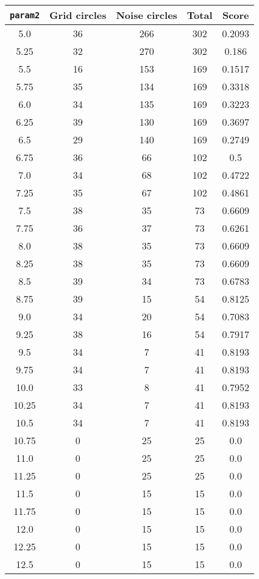 \documentclass[letterpaper, 12pt]{article}
\begin{document}
\begin{longtable}{|c|c|c|c|c|}
\hline
\textbf{\texttt{param2}} & \textbf{Grid circles} & \textbf{Noise circles} & \textbf{Total} & \textbf{Score} \\
\hline
5.0 & 36 & 266 & 302 & 0.2093 \\
\hline
5.25 & 32 & 270 & 302 & 0.186 \\
\hline
5.5 & 16 & 153 & 169 & 0.1517 \\
\hline
5.75 & 35 & 134 & 169 & 0.3318 \\
\hline
6.0 & 34 & 135 & 169 & 0.3223 \\
\hline
6.25 & 39 & 130 & 169 & 0.3697 \\
\hline
6.5 & 29 & 140 & 169 & 0.2749 \\
\hline
6.75 & 36 & 66 & 102 & 0.5 \\
\hline
7.0 & 34 & 68 & 102 & 0.4722 \\
\hline
7.25 & 35 & 67 & 102 & 0.4861 \\
\hline
7.5 & 38 & 35 & 73 & 0.6609 \\
\hline
7.75 & 36 & 37 & 73 & 0.6261 \\
\hline
8.0 & 38 & 35 & 73 & 0.6609 \\
\hline
8.25 & 38 & 35 & 73 & 0.6609 \\
\hline
8.5 & 39 & 34 & 73 & 0.6783 \\
\hline
8.75 & 39 & 15 & 54 & 0.8125 \\
\hline
9.0 & 34 & 20 & 54 & 0.7083 \\
\hline
9.25 & 38 & 16 & 54 & 0.7917 \\
\hline
9.5 & 34 & 7 & 41 & 0.8193 \\
\hline
9.75 & 34 & 7 & 41 & 0.8193 \\
\hline
10.0 & 33 & 8 & 41 & 0.7952 \\
\hline
10.25 & 34 & 7 & 41 & 0.8193 \\
\hline
10.5 & 34 & 7 & 41 & 0.8193 \\
\hline
10.75 & 0 & 25 & 25 & 0.0 \\
\hline
11.0 & 0 & 25 & 25 & 0.0 \\
\hline
11.25 & 0 & 25 & 25 & 0.0 \\
\hline
11.5 & 0 & 15 & 15 & 0.0 \\
\hline
11.75 & 0 & 15 & 15 & 0.0 \\
\hline
12.0 & 0 & 15 & 15 & 0.0 \\
\hline
12.25 & 0 & 15 & 15 & 0.0 \\
\hline
12.5 & 0 & 15 & 15 & 0.0 \\

\end{longtable}
\end{document}
